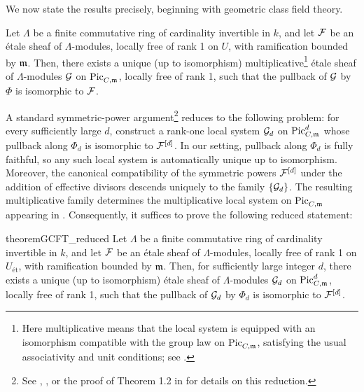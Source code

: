 We now state the results precisely, beginning with geometric class field theory.
\begin{theorem}\label{thm:GCFT}
    Let $\Lambda$ be a finite commutative ring of cardinality invertible in $k$, and let $\cF$ be an \'etale sheaf of $\Lambda$-modules, locally free of rank 1 on $U$, with ramification bounded by $\mdls$. 
    Then, there exists a unique (up to isomorphism) 
    multiplicative\footnote{Here multiplicative means that the local system is equipped with an isomorphism compatible with the group law on $\PicCm$, satisfying the usual associativity and unit conditions; see \cite{Guignard2018}.} 
\'etale sheaf of $\Lambda$-modules $\cG$ on $\PicCm$, locally free of rank 1, such that the pullback of $\cG$ by $\Phi$ is isomorphic to $\cF$.
\end{theorem}

A standard symmetric-power argument\footnote{See \cite[\S5.10]{Guignard2018}, \cite[\S8.3]{tendler2015geometricclassfieldtheory}, or the proof of Theorem 1.2 in \cite{takeuchi2018blow} for details on this reduction.} reduces  to the following problem: for every sufficiently large $d$, construct a rank-one local system $\cG_d$ on $\PicCm[d]$ whose pullback along $\Phi_d$ is isomorphic to $\cF^{[d]}$.
In our setting, pullback along $\Phi_d$ is fully faithful, so any such local system is automatically unique up to isomorphism.
Moreover, the canonical compatibility of the symmetric powers $\cF^{[d]}$ under the addition of effective divisors descends uniquely to the family $\{\cG_d\}$.
The resulting multiplicative family determines the multiplicative local system on $\PicCm$ appearing in .
Consequently, it suffices to prove the following reduced statement:

\begin{restatable}{theorem}{GCFT_reduced}\label{thm:GCFT_reduced}
    Let $\Lambda$ be a finite commutative ring of cardinality invertible in $k$, and let $\cF$ be an \'etale sheaf of $\Lambda$-modules, locally free of rank 1 on $U_{\text{\'et}}$, with ramification bounded by $\mdls$. 
    Then, for sufficiently large integer $d$, there exists a unique (up to isomorphism) \'etale sheaf of $\Lambda$-modules $\cG_d$ on $\PicCm[d]$, locally free of rank 1, such that the pullback of $\cG_d$ by $\Phi_d$ is isomorphic to $\cF^{[d]}$.
\end{restatable}



